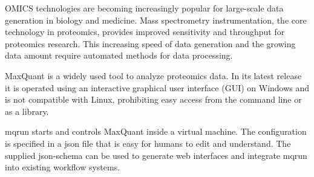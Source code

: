 OMICS technologies are becoming increasingly popular for large-scale data
generation in biology and medicine. Mass spectrometry instrumentation, the core
technology in proteomics, provides improved sensitivity and throughput for
proteomics research. This increasing speed of data generation and the growing
data amount require automated methods for data processing.

MaxQuant is a widely used tool to analyze proteomics data. In its latest
release it is operated using an interactive graphical user interface (GUI) on
Windows and is not compatible with Linux, prohibiting easy access from the
command line or as a library.

mqrun starts and controls MaxQuant inside a virtual machine. The configuration
is specified in a json file that is easy for humans to edit and understand.
The supplied json-schema can be used to generate web interfaces and integrate
mqrun into existing workflow systems.
